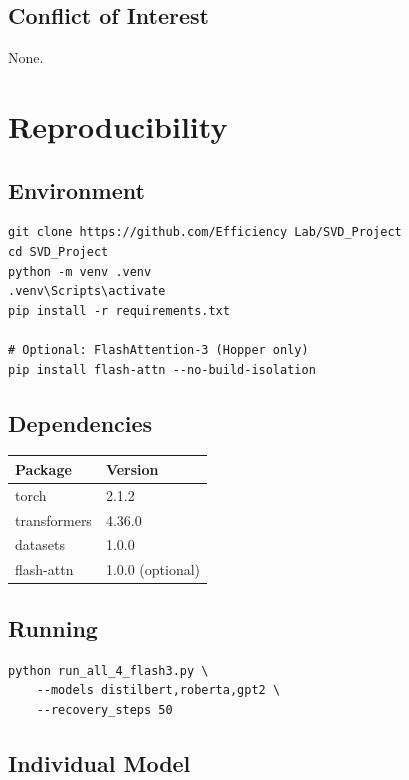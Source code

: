 \subsection{Conflict of Interest}

None.



\section{Reproducibility}

\subsection{Environment}

\begin{lstlisting}
git clone https://github.com/Efficiency Lab/SVD_Project
cd SVD_Project
python -m venv .venv
.venv\Scripts\activate
pip install -r requirements.txt

# Optional: FlashAttention-3 (Hopper only)
pip install flash-attn --no-build-isolation
\end{lstlisting}

\subsection{Dependencies}

\begin{table}[H]
\centering
\small
\begin{tabular}{ll}
\toprule
\textbf{Package} & \textbf{Version} \\
\midrule
torch & 2.1.2 \\
transformers & 4.36.0 \\
datasets & 1.0.0 \\
flash-attn & 1.0.0 (optional) \\
\bottomrule
\end{tabular}
\end{table}

\subsection{Running}

\begin{lstlisting}
python run_all_4_flash3.py \
    --models distilbert,roberta,gpt2 \
    --recovery_steps 50
\end{lstlisting}

\subsection{Individual Model}

